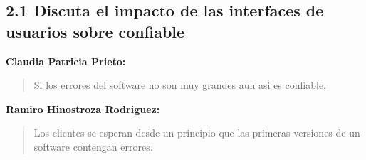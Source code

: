\subsection*{2.1 Discuta el impacto de las interfaces de usuarios sobre confiable}

\textbf{Claudia Patricia Prieto:}
\begin{quote}
Si los errores del software no son muy grandes aun asi es confiable.
\end{quote}

\textbf{Ramiro Hinostroza Rodriguez:}
\begin{quote}
Los clientes se esperan desde un principio que las primeras versiones de un software contengan errores.
\end{quote}